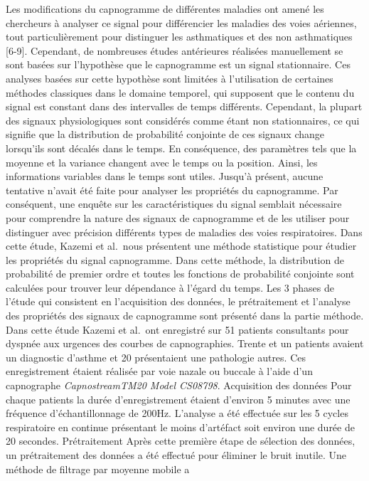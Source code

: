 \documentclass[12pt,]{article}
\begin{document}
Les modifications du capnogramme de différentes maladies ont amené les
chercheurs à analyser ce signal pour différencier les maladies des voies
aériennes, tout particulièrement pour distinguer les asthmatiques et des
non asthmatiques {[}6-9{]}. Cependant, de nombreuses études antérieures
réalisées manuellement se sont basées sur l'hypothèse que le capnogramme
est un signal stationnaire. Ces analyses basées sur cette hypothèse sont
limitées à l'utilisation de certaines méthodes classiques dans le
domaine temporel, qui supposent que le contenu du signal est constant
dans des intervalles de temps différents. Cependant, la plupart des
signaux physiologiques sont considérés comme étant non stationnaires, ce
qui signifie que la distribution de probabilité conjointe de ces signaux
change lorsqu'ils sont décalés dans le temps. En conséquence, des
paramètres tels que la moyenne et la variance changent avec le temps ou
la position. Ainsi, les informations variables dans le temps sont
utiles. Jusqu'à présent, aucune tentative n'avait été faite pour
analyser les propriétés du capnogramme. Par conséquent, une enquête sur
les caractéristiques du signal semblait nécessaire pour comprendre la
nature des signaux de capnogramme et de les utiliser pour distinguer
avec précision différents types de maladies des voies respiratoires.
Dans cette étude, Kazemi et al.~nous présentent une méthode statistique
pour étudier les propriétés du signal capnogramme. Dans cette méthode,
la distribution de probabilité de premier ordre et toutes les fonctions
de probabilité conjointe sont calculées pour trouver leur dépendance à
l'égard du temps. Les 3 phases de l'étude qui consistent en
l'acquisition des données, le prétraitement et l'analyse des propriétés
des signaux de capnogramme sont présenté dans la partie méthode. Dans
cette étude Kazemi et al.~ont enregistré sur 51 patients consultants
pour dyspnée aux urgences des courbes de capnographies. Trente et un
patients avaient un diagnostic d'asthme et 20 présentaient une
pathologie autres. Ces enregistrement étaient réalisée par voie nazale
ou buccale à l'aide d'un capnographe \emph{CapnostreamTM20 Model
CS08798}. Acquisition des données Pour chaque patients la durée
d'enregistrement étaient d'environ 5 minutes avec une fréquence
d'échantillonnage de 200Hz. L'analyse a été effectuée sur les 5 cycles
respiratoire en continue présentant le moins d'artéfact soit environ une
durée de 20 secondes. Prétraitement Après cette première étape de
sélection des données, un prétraitement des données a été effectué pour
éliminer le bruit inutile. Une méthode de filtrage par moyenne mobile a
\end{document}
